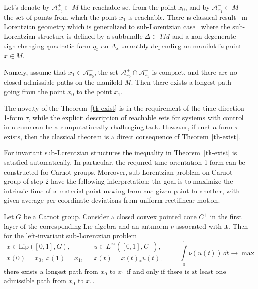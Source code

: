 \documentclass[12pt]{llncs}
\begin{document}
Let's denote by $\mathcal{A}^+_{x_0} \subset M$ the reachable set from the point $x_0$, and by $\mathcal{A}^-_{x_1} \subset M$ the set of points from which the point $x_1$ is reachable.
There is classical result~\cite{beem-ehrlich-easley} in Lorentzian geometry which is generalized to sub-Lorentzian case~\cite{grochowski,sachkov} where the sub-Lorentzian structure is defined by a subbundle $\Delta \subset TM$ and a non-degenerate sign changing quadratic form $q_x$ on $\Delta_x$ smoothly depending on manifold's point $x \in M$.

Namely, assume that $x_1 \in \mathcal{A}^+_{x_0}$, the set $\mathcal{A}^+_{x_0} \cap \mathcal{A}^-_{x_1}$ is compact, and there are no closed admissible paths on the manifold $M$.
Then there exists a longest path going from the point $x_0$ to the point $x_1$.

The novelty of the Theorem~\ref{th-exist} is in the requirement of the time direction 1-form $\tau$,
while the explicit description of reachable sets for systems with control in a cone can be a computationally challenging task.
However, if such a form $\tau$ exists, then the classical theorem is a direct consequence of Theorem~\ref{th-exist}.

For invariant sub-Lorentzian structures the inequality in Theorem~\ref{th-exist} is satisfied automatically.
In particular, the required time orientation 1-form can be constructed for Carnot groups.
Moreover, sub-Lorentzian problem on Carnot group of step 2 have the following interpretation:
the goal is to maximize the intrinsic time of a material point moving from one given point to another, with given average per-coordinate deviations from uniform rectilinear motion.

\begin{corollary}
\label{crl-carnot}
Let $G$ be a Carnot group. Consider a closed convex pointed cone $C^+$ in the first layer of the corresponding Lie algebra and an antinorm $\nu$ associated with it. Then for the left-invariant sub-Lorentzian problem
$$
\begin{array}{ll}
x \in \mathrm{Lip}{([0,1], G)}, & u \in L^\infty{([0,1], C^+)},\\
x(0) = x_0, \ x(1) = x_1, \ \ \ & \dot{x}(t) = x(t)_* u(t),\\
\end{array}
\qquad
\int\limits_0^1{\nu(u(t))\, dt} \rightarrow \max
$$
there exists a longest path from $x_0$ to $x_1$ if and only if there is at least one admissible path from $x_0$ to $x_1$.
\end{corollary}
\end{document}
